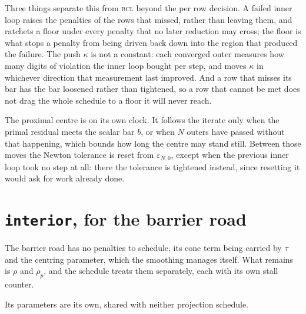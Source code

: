 \documentclass[a4paper,11pt]{book}
\theoremstyle{plain}
\theoremstyle{definition}
\theoremstyle{remark}
\numberwithin{equation}{chapter}
\numberwithin{algorithm}{chapter}
\begin{document}
	Three things separate this from \textsc{bcl} beyond the per row decision. A
	failed inner loop raises the penalties of the rows that missed, rather than
	leaving them, and ratchets a floor under every penalty that no later
	reduction may cross; the floor is what stops a penalty from being driven back
	down into the region that produced the failure. The push $\kappa$ is not a
	constant: each converged outer measures how many digits of violation the
	inner loop bought per step, and moves $\kappa$ in whichever direction that
	measurement last improved. And a row that misses its bar has the bar
	loosened rather than tightened, so a row that cannot be met does not drag the
	whole schedule to a floor it will never reach.

	The proximal centre is on its own clock. It follows the iterate only when the
	primal residual meets the scalar bar $b$, or when $N$ outers have passed
	without that happening, which bounds how long the centre may stand still.
	Between those moves the Newton tolerance is reset from $\varepsilon_{N,0}$,
	except when the previous inner loop took no step at all: there the tolerance
	is tightened instead, since resetting it would ask for work already done.


	\section{\texttt{interior}, for the barrier road}

	The barrier road has no penalties to schedule, its cone term being carried by
	$\tau$ and the centring parameter, which the smoothing manages itself. What
	remains is $\rho$ and $\rho_p$, and the schedule treats them separately,
	each with its own stall counter.

	Its parameters are its own, shared with neither projection schedule.
\end{document}
